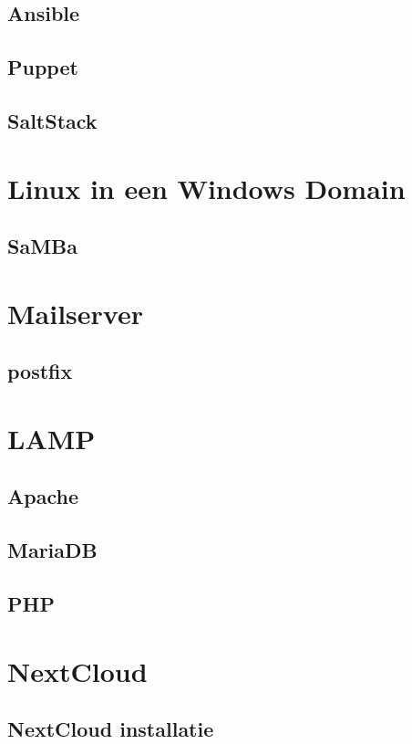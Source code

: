 \documentclass[a4paper,12pt,twoside,openright,titlepage]{book}
\begin{document}
\section{Ansible}
\section{Puppet}
\section{SaltStack}


\chapter{Linux in een Windows Domain}
\section{SaMBa}

\chapter{Mailserver}
\section{postfix}

\chapter{LAMP}

\section{Apache}


\section{MariaDB}

\section{PHP}


\chapter{NextCloud}

\section{NextCloud installatie}



\printindex
\end{document}
